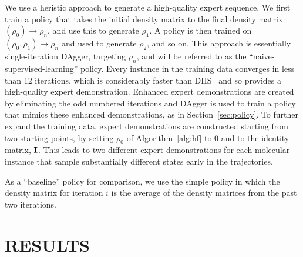 \documentclass[twoside,11pt]{article}
\begin{document}
We use a heristic approach to generate a high-quality expert sequence. We first train a policy that takes the initial density matrix to the final density matrix $(\rho_0) \rightarrow \rho_n$, and use this to generate $\rho_1$. A policy is then trained on $(\rho_0, \rho_1) \rightarrow \rho_n$ and used to generate $\rho_2$, and so on. This approach is essentially single-iteration DAgger, targeting $\rho_n$, and will be referred to as the ``naive-supervised-learning'' policy. Every instance in the training data converges in less than 12 iterations, which is considerably faster than DIIS~\cite{Pulay1980} and so provides a high-quality expert demonstration. Enhanced expert demonstrations are created by eliminating the odd numbered iterations and DAgger is used to train a policy that mimics these enhanced demonstrations, as in Section~\ref{sec:policy}. To further expand the training data, expert demonstrations are constructed starting from two starting points, by setting $\rho_0$ of Algorithm~\ref{alg:hf} to 0 and to the identity matrix, ${\bf I}$. This leads to two different expert demonstrations for each molecular instance that sample substantially different states early in the trajectories. 

As a ``baseline'' policy for comparison, we use the simple policy in which the density matrix for iteration $i$ is the average of the density matrices from the past two iterations.

\section{RESULTS}
\end{document}
